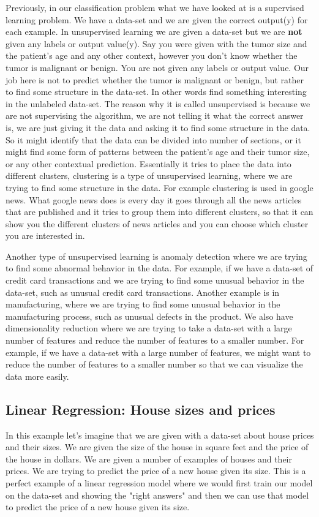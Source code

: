 Previously, in our classification problem what we have looked at is a supervised learning problem. We have a data-set and we are given the correct output(y) for each example. In unsupervised learning we are given a data-set but we are \textbf{not} given any labels or output value(y). Say you were given with the tumor size and the patient's age and any other context, however you don't know whether the tumor is malignant or benign. You are not given any labels or output value. 
Our job here is not to predict whether the tumor is malignant or benign, but rather to find some structure in the data-set. In other words find something interesting in the unlabeled data-set. 
The reason why it is called unsupervised is because we are not supervising the algorithm, we are not telling it what the correct answer is, we are just giving it the data and asking it to find some structure in the data.
So it might identify that the data can be divided into number of sections, or it might find some form of patterns between the patient's age and their tumor size, or any other contextual prediction.
Essentially it tries to place the data into different clusters, clustering is a type of unsupervised learning, where we are trying to find some structure in the data. For example clustering is used in google news. 
What google news does is every day it goes through all the news articles that are published and it tries to group them into different clusters, so that it can show you the different clusters of news articles and you can choose which cluster you are interested in.

Another type of unsupervised learning is anomaly detection where we are trying to find some abnormal behavior in the data. For example, if we have a data-set of credit card transactions and we are trying to find some unusual behavior in the data-set, such as unusual credit card transactions.
Another example is in manufacturing, where we are trying to find some unusual behavior in the manufacturing process, such as unusual defects in the product.
We also have dimensionality reduction where we are trying to take a data-set with a large number of features and reduce the number of features to a smaller number. For example, if we have a data-set with a large number of features, we might want to reduce the number of features to a smaller number so that we can visualize the data more easily.

\subsection{Linear Regression: House sizes and prices}
In this example let's imagine that we are given with a data-set about house prices and their sizes. We are given the size of the house in square feet and the price of the house in dollars. We are given a number of examples of houses and their prices. We are trying to predict the price of a new house given its size.
This is a perfect example of a linear regression model where we would first train our model on the data-set and showing the "right answers" and then we can use that model to predict the price of a new house given its size.

